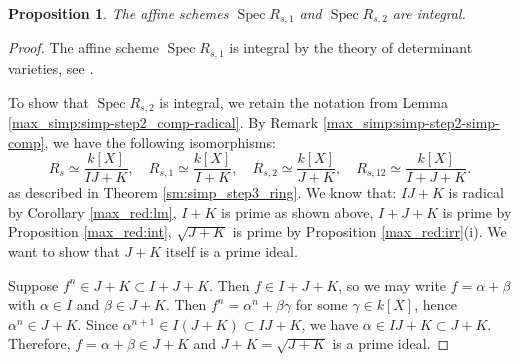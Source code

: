 \documentclass[pdflatex,sn-mathphys-num]{sn-jnl}%
\theoremstyle{thmstyleone}%
\newtheorem{proposition}[subsubsection]{Proposition}%
\theoremstyle{thmstyletwo}%
\numberwithin{equation}{subsection}
\theoremstyle{thmstylethree}%
\DeclareMathOperator{\Spec}{Spec}
\begin{document}
\begin{proposition}\label{max_red:irr-red}
The affine schemes $\Spec R_{s,1}$ and $\Spec R_{s,2}$ are integral.
\end{proposition}
\begin{proof}
The affine scheme $\Spec R_{s,1}$ is integral by the theory of determinant varieties, see \cite[(2.11)]{BU1998}. 

To show that $\Spec R_{s,2}$ is integral, we retain the notation from Lemma \ref{max_simp:simp-step2_comp-radical}. 
By Remark \ref{max_simp:simp-step2-simp-comp}, we have the following isomorphisms:
\begin{equation*}
    R_{s}\simeq \frac{k[X]}{IJ+K},\quad
    R_{s,1}\simeq \frac{k[X]}{I+K},\quad
    R_{s,2}\simeq \frac{k[X]}{J+K},\quad
    R_{s,12}\simeq \frac{k[X]}{I+J+K}.
\end{equation*}
as described in Theorem \ref{sm:simp_step3_ring}. We know that:
$IJ+K$ is radical by Corollary \ref{max_red:lm},
$I+K$ is prime as shown above,
$I+J+K$ is prime by Proposition \ref{max_red:int},
$\sqrt{J+K}$ is prime by Proposition \ref{max_red:irr}(i).
We want to show that $J+K$ itself is a prime ideal. 

Suppose $f^n\in J+K\subset I+J+K$. Then $f\in I+J+K$, so we may write $f=\alpha+\beta$ with $\alpha\in I$ and $\beta\in J+K$. 
Then $f^n=\alpha^n+\beta\gamma$ for some $\gamma\in k[X]$, hence $\alpha^n\in J+K$.
Since $\alpha^{n+1}\in I(J+K)\subset IJ+K$, we have $\alpha\in IJ+K\subset J+K$.
Therefore, $f=\alpha+\beta\in J+K$ and $J+K=\sqrt{J+K}$ is a prime ideal.
\end{proof}
\end{document}

